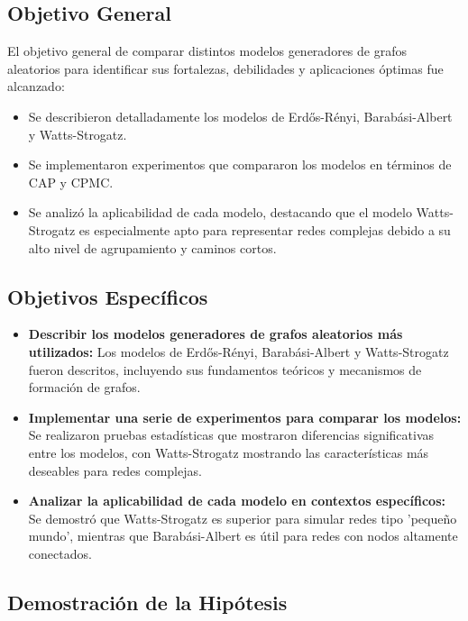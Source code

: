 \documentclass[12pt]{book}
\begin{document}
\subsection{Objetivo General}

El objetivo general de comparar distintos modelos generadores de grafos aleatorios para identificar sus fortalezas, debilidades y aplicaciones óptimas fue alcanzado:

\begin{itemize}
    \item Se describieron detalladamente los modelos de Erdős-Rényi, Barabási-Albert y Watts-Strogatz.
    \item Se implementaron experimentos que compararon los modelos en términos de CAP y CPMC.
    \item Se analizó la aplicabilidad de cada modelo, destacando que el modelo Watts-Strogatz es especialmente apto para representar redes complejas debido a su alto nivel de agrupamiento y caminos cortos.
\end{itemize}

\subsection{Objetivos Específicos}

\begin{itemize}
    \item \textbf{Describir los modelos generadores de grafos aleatorios más utilizados:} Los modelos de Erdős-Rényi, Barabási-Albert y Watts-Strogatz fueron descritos, incluyendo sus fundamentos teóricos y mecanismos de formación de grafos.
    \item \textbf{Implementar una serie de experimentos para comparar los modelos:} Se realizaron pruebas estadísticas que mostraron diferencias significativas entre los modelos, con Watts-Strogatz mostrando las características más deseables para redes complejas.
    \item \textbf{Analizar la aplicabilidad de cada modelo en contextos específicos:} Se demostró que Watts-Strogatz es superior para simular redes tipo 'pequeño mundo', mientras que Barabási-Albert es útil para redes con nodos altamente conectados.
\end{itemize}

\subsection{Demostración de la Hipótesis}
\end{document}
